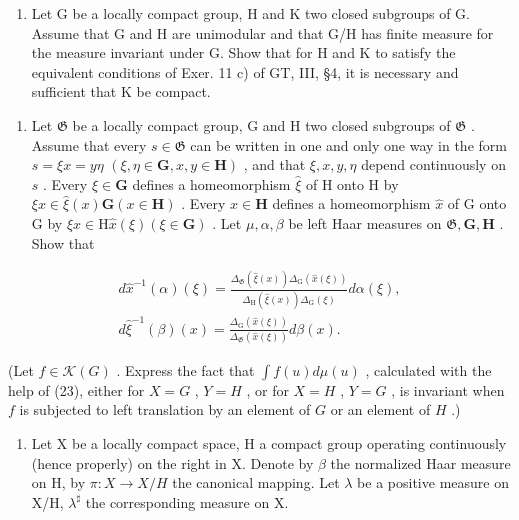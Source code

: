 \begin{enumerate}
\def\labelenumi{\alph{enumi})}
\setcounter{enumi}{1}
\tightlist
\item
  Let G be a locally compact group, H and K two closed subgroups of G. Assume that G and H are unimodular and that G/H has finite measure for the measure invariant under G. Show that for H and K to satisfy the equivalent conditions of Exer. 11 c) of GT, III, §4, it is necessary and sufficient that K be compact.
\end{enumerate}

\begin{enumerate}
\def\labelenumi{\arabic{enumi})}
\setcounter{enumi}{7}
\tightlist
\item
  Let \(\mathfrak{G}\) be a locally compact group, G and H two closed subgroups of \(\mathfrak{G}\) . Assume that every \(s \in \mathfrak{G}\) can be written in one and only one way in the form \(s = \xi x = y\eta\) \((\xi, \eta \in \mathbf{G}, x, y \in \mathbf{H})\) , and that \(\xi, x, y, \eta\) depend continuously on \(s\) . Every \(\xi \in \mathbf{G}\) defines a homeomorphism \(\widehat{\xi}\) of H onto H by \(\xi x \in \widehat{\xi}(x)\mathbf{G} (x \in \mathbf{H})\) . Every \(x \in \mathbf{H}\) defines a homeomorphism \(\widehat{x}\) of G onto G by \(\xi x \in \mathrm{H}\widehat{x}(\xi) (\xi \in \mathbf{G})\) . Let \(\mu, \alpha, \beta\) be left Haar measures on \(\mathfrak{G}, \mathbf{G}, \mathbf{H}\) . Show that
\end{enumerate}

\[
\begin{array}{c} d \widehat {x} ^ {- 1} (\alpha) (\xi) = \frac {\Delta_ {\mathfrak {G}} (\widehat {\xi} (x)) \Delta_ {\mathrm{G}} (\widehat {x} (\xi))}{\Delta_ {\mathrm{H}} (\widehat {\xi} (x)) \Delta_ {\mathrm{G}} (\xi)} d \alpha (\xi), \\ d \widehat {\xi} ^ {- 1} (\beta) (x) = \frac {\Delta_ {\mathrm{G}} (\widehat {x} (\xi))}{\Delta_ {\mathfrak {G}} (\widehat {x} (\xi))} d \beta (x). \end{array}
\]

(Let \(f \in \mathcal{K}(G)\) . Express the fact that \(\int f(u) d\mu(u)\) , calculated with the help of (23), either for \(X = G\) , \(Y = H\) , or for \(X = H\) , \(Y = G\) , is invariant when \(f\) is subjected to left translation by an element of \(G\) or an element of \(H\) .)

\begin{enumerate}
\def\labelenumi{\arabic{enumi})}
\setcounter{enumi}{8}
\tightlist
\item
  Let X be a locally compact space, H a compact group operating continuously (hence properly) on the right in X. Denote by \(\beta\) the normalized Haar measure on H, by \(\pi: X \to X/H\) the canonical mapping. Let \(\lambda\) be a positive measure on X/H, \(\lambda^{\sharp}\) the corresponding measure on X.
\end{enumerate}

